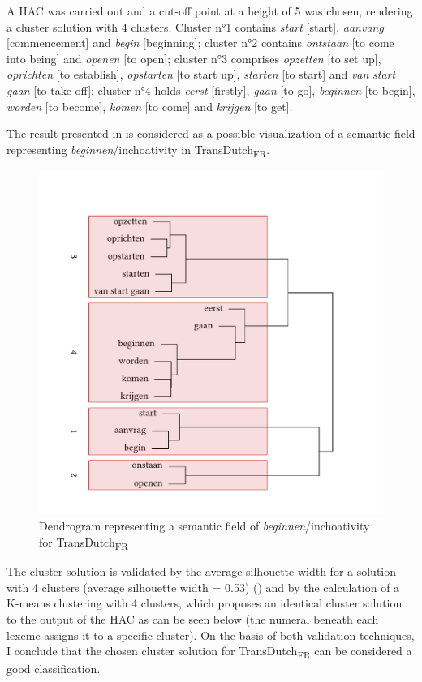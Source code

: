 A HAC was carried out and a cut-off point at a height of 5 was chosen, rendering a cluster solution with 4 clusters. Cluster n°1 contains \textit{start} [start], \textit{aanvang} [commencement] and \textit{begin} [beginning]; cluster n°2 contains \textit{ontstaan} [to come into being] and \textit{openen} [to open]; cluster n°3 comprises \textit{opzetten} [to set up], \textit{oprichten} [to establish], \textit{opstarten} [to start up], \textit{starten} [to start] and \textit{van} \textit{start} \textit{gaan} [to take off]; cluster n°4 holds \textit{eerst} [firstly], \textit{gaan} [to go], \textit{beginnen} [to begin], \textit{worden} [to become], \textit{komen} [to come] and \textit{krijgen} [to get].

The result presented in  is considered as a possible visualization of a semantic field representing \textit{beginnen}/inchoativity in TransDutch\textsubscript{FR}.

\begin{figure}
\includegraphics[height=.4\textheight]{figures/tree78.pdf}
\caption{\label{fig:4:76}  Dendrogram representing a semantic field of \textit{beginnen}/inchoativity for TransDutch\textsubscript{FR}}
\end{figure}

The cluster solution is validated by the average silhouette width for a solution with 4 clusters (average silhouette width = 0.53) () and by the calculation of a K-means clustering with 4 clusters, which proposes an identical cluster solution to the output of the HAC as can be seen below (the numeral beneath each lexeme assigns it to a specific cluster). On the basis of both validation techniques, I conclude that the chosen cluster solution for TransDutch\textsubscript{FR} can be considered a good classification.

